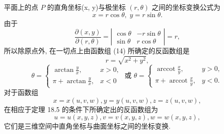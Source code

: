 \begin{example}

\end{example}
平面上的点 \(P\) 的直角坐标(x, y)与极坐标 \(\left( {r,\theta }\right)\) 之间的坐标变换公式为
\[
x = r\cos \theta ,\;y = r\sin \theta . \tag{14}
\]
由于
\[
\frac{\partial \left( {x,y}\right) }{\partial \left( {r,\theta }\right) } = \left| \begin{matrix} \cos \theta &  - r\sin \theta \\  \sin \theta & r\cos \theta  \end{matrix}\right|  = r,
\]
所以除原点外, 在一切点上由函数组 (14) 所确定的反函数组是
\[
r = \sqrt{{x}^{2} + {y}^{2}},
\]
\[
\theta  = \left\{  {\begin{array}{ll} \arctan \frac{y}{x}, & x > 0, \\  \pi  + \arctan \frac{y}{x}, & x < 0 \end{array}\text{ 或 }\theta  = \left\{  \begin{array}{ll} \operatorname{arccot}\frac{x}{y}, & y > 0, \\  \pi  + \operatorname{arccot}\frac{x}{y}, & y < 0. \end{array}\right. }\right.
\]
对于函数组
\[
x = x\left( {u,v,w}\right) ,y = y\left( {u,v,w}\right) ,z = z\left( {u,v,w}\right) ,
\]
在相应于定理 18.5 的条件下所确定出的反函数组为
\[
u = u\left( {x,y,z}\right) ,v = v\left( {x,y,z}\right) ,w = w\left( {x,y,z}\right) ,
\]
它们是三维空间中直角坐标与曲面坐标之间的坐标变换.

